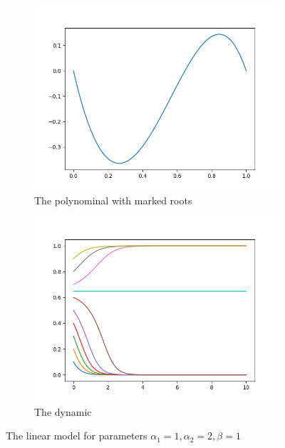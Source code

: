 \documentclass[11pt]{article}
\begin{document}
\begin{figure}[h]
        \centering
        \begin{subfigure}{.5\textwidth}
        \centering
        \includegraphics[scale=0.5]{polynominallinearmodel.png}
        \caption{The polynominal with marked roots} 
        \end{subfigure}%
        \begin{subfigure}{.5\textwidth}
        \centering
        \includegraphics[scale=0.5]{dynamiclinearmodel.png}
        \caption{The dynamic} 
        \label{fig:dynamiclinear}
        \end{subfigure}%
        \caption{The linear model for parameters $\alpha_1=1,\alpha_2=2,
        \beta=1$}
\end{figure}
\end{document}
